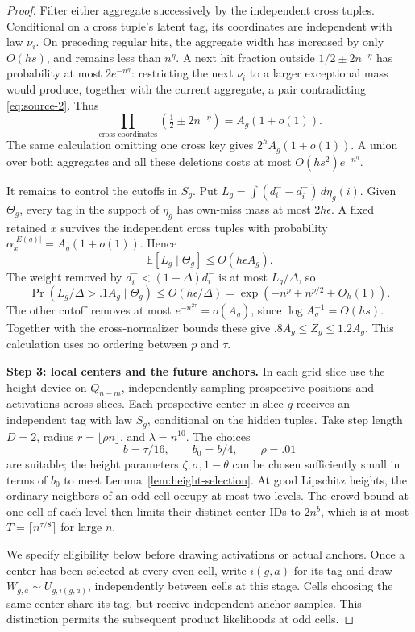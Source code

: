 \begin{proof}
Filter either aggregate successively by the independent cross tuples. Conditional on a cross tuple's latent tag, its coordinates are independent with law \(\nu_i\). On preceding regular hits, the aggregate width has increased by only \(O(hs)\), and remains less than \(n^\eta\). A next hit fraction outside \(1/2\pm2n^{-\eta}\) has probability at most \(2e^{-n^\eta}\): restricting the next \(\nu_i\) to a larger exceptional mass would produce, together with the current aggregate, a pair contradicting \eqref{eq:source-2}. Thus
\[
 \prod_{\text{cross coordinates}}
       \left(\tfrac12\pm2n^{-\eta}\right)
 =A_g(1+o(1)).
\]
The same calculation omitting one cross key gives \(2^hA_g(1+o(1))\). A union over both aggregates and all these deletions costs at most \(O(hs^2)e^{-n^\eta}\).

It remains to control the cutoffs in \(S_g\). Put
\(L_g=\int(d_i^--d_i^+)\,d\eta_g(i)\).
Given \(\Theta_g\), every tag in the support of \(\eta_g\) has own-miss mass at most \(2h\epsilon\). A fixed retained \(x\) survives the independent cross tuples with probability
\(\alpha_x^{|E(g)|}=A_g(1+o(1))\). Hence
\[
 \mathbb E[L_g\mid\Theta_g]\le O(h\epsilon A_g).
\]
The weight removed by \(d_i^+<(1-\Delta)d_i^-\) is at most \(L_g/\Delta\), so
\[
 \Pr(L_g/\Delta>.1A_g\mid\Theta_g)
 \le O(h\epsilon/\Delta)
 =\exp(-n^p+n^{p/2}+O_h(1)).
\]
The other cutoff removes at most
\(e^{-n^{2\tau}}=o(A_g)\), since \(\log A_g^{-1}=O(hs)\).
Together with the cross-normalizer bounds these give
\(.8A_g\le Z_g\le1.2A_g\). This calculation uses no ordering between \(p\) and \(\tau\).

\noindent\textbf{Step 3: local centers and the future anchors.}\quad
In each grid slice use the height device on \(Q_{n-m}\), independently sampling prospective positions and activations across slices. Each prospective center in slice \(g\) receives an independent tag with law \(S_g\), conditional on the hidden tuples. Take step length \(D=2\), radius \(r=\lfloor\rho n\rfloor\), and \(\lambda=n^{10}\). The choices
\[
 b=\tau/16,\qquad b_0=b/4,\qquad \rho=.01
\]
are suitable; the height parameters \(\zeta,\sigma,1-\theta\) can be chosen sufficiently small in terms of \(b_0\) to meet Lemma~\ref{lem:height-selection}. At good Lipschitz heights, the ordinary neighbors of an odd cell occupy at most two levels. The crowd bound at one cell of each level then limits their distinct center IDs to \(2n^b\), which is at most
\(T=\lceil n^{\tau/8}\rceil\) for large \(n\).

We specify eligibility below before drawing activations or actual anchors. Once a center has been selected at every even cell, write \(i(g,a)\) for its tag and draw
\(W_{g,a}\sim U_{g,i(g,a)}\), independently between cells at this stage. Cells choosing the same center share its tag, but receive independent anchor samples. This distinction permits the subsequent product likelihoods at odd cells.


\end{proof}

